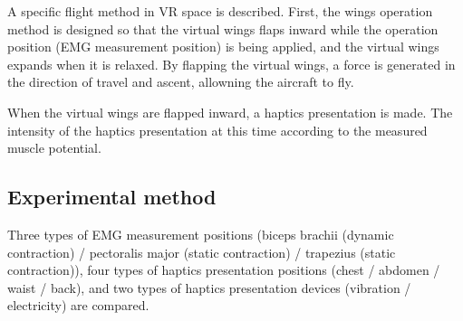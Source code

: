 \documentclass[letterpaper, 10 pt, conference]{ieeeconf}  %
\begin{document}
                
                A specific flight method in VR space is described.  
                First, the wings operation method is designed so that the virtual wings flaps inward while the operation position (EMG measurement position) is being applied, and the virtual wings expands when it is relaxed.  
                By flapping the virtual wings, a force 
                is generated in the direction of travel and ascent, allowning the aircraft to fly.  

                When the virtual wings are flapped inward, a haptics presentation is made.  
                The intensity of the haptics presentation at this time 
                according to the measured muscle potential.  

        
        \subsection{Experimental method}
                Three types of EMG measurement positions (biceps brachii (dynamic contraction) / pectoralis major (static contraction) / trapezius (static contraction)), four types of haptics presentation positions (chest / abdomen / waist / back), and two types of haptics presentation devices (vibration / electricity) are compared.  
                
\end{document}
